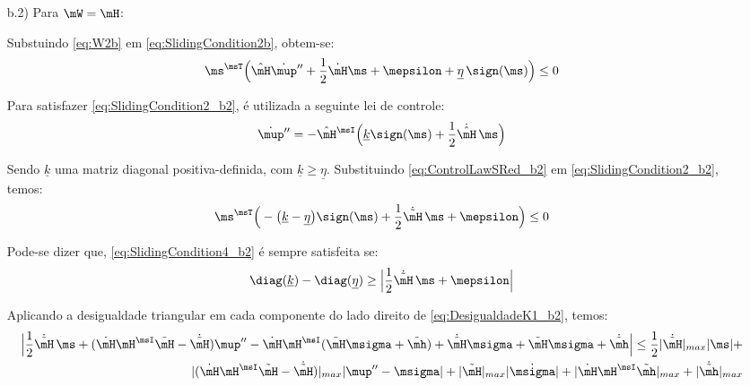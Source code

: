 \documentclass[]{politex}
\begin{document}
\begin{itemize}
\begin{itemize}
\item[b.2)] Para $\mW = \mH$:


Substuindo \eqref{eq:W2b} em \eqref{eq:SlidingCondition2b}, obtem-se:
\begin{equation} \label{eq:SlidingCondition2_b2}
\ms^\msT \Big( \hat{\mH} \dot{\mup}'' + \frac{1}{2} \dot{\mH} \ms  + \mepsilon + \underline{\eta} \, \sign(\ms) \Big) \leq 0
\end{equation}

Para satisfazer \eqref{eq:SlidingCondition2_b2}, é utilizada a seguinte lei de controle:
\begin{equation} \label{eq:ControlLawSRed_b2}
\dot{\mup}'' =  - \hat{\mH}^\msI \Big( \underline{k} \sign(\ms) +  \frac{1}{2} \dot{\hat{\mH}} \, \ms \Big) 
\end{equation}

Sendo $\underline{k}$ uma matriz diagonal positiva-definida, com $\underline{k} \geq \underline{\eta} $. Substituindo \eqref{eq:ControlLawSRed_b2} em \eqref{eq:SlidingCondition2_b2}, temos:
\begin{equation} \label{eq:SlidingCondition4_b2}
\ms^\msT \Big(- \big(\underline{k} - \underline{\eta} \big)  \sign(\ms) + \frac{1}{2} \dot{\tilde{\mH}} \, \ms + \mepsilon  \Big) \leq 0
\end{equation}

Pode-se dizer que, \eqref{eq:SlidingCondition4_b2} \'e sempre satisfeita se:
\begin{equation} \label{eq:DesigualdadeK1_b2}
 \diag(\underline{k}) - \diag(\underline{\eta}) \geq  \Big| \frac{1}{2} \dot{\tilde{\mH}} \, \ms + \mepsilon \Big|
\end{equation}

Aplicando a desigualdade triangular em cada componente do lado direito de \eqref{eq:DesigualdadeK1_b2}, temos:
\begin{equation}
\begin{split}
\Big| \frac{1}{2} \dot{\tilde{\mH}} \, \ms + ( \dot{\mH} \mH^\msI \tilde{\mH} -\dot{\tilde{\mH}}) \mup'' -  \dot{\mH} \mH^\msI ( \tilde{\mH}\msigma + \tilde{\mh} ) +  \dot{\tilde{\mH}}\msigma + \tilde{\mH} {\msigma} + \dot{\tilde{\mh}} \Big| \leq  \frac{1}{2}|\dot{\tilde{\mH}}|_{max} |\ms| + \\
 |( \dot{\mH} \mH^\msI \tilde{\mH} -\dot{\tilde{\mH}})|_{max} 	|\mup'' - \msigma | + |\tilde{\mH}|_{max} |\dot{\msigma}| + |\dot{\mH} \mH^\msI \tilde{\mh}|_{max} + |\dot{\tilde{\mh}}|_{max}
\end{split}
\end{equation}


\end{itemize}
\end{itemize}
\end{document}
